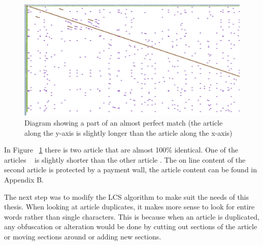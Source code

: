 \begin{figure}
	\centering
	\includegraphics[scale=0.4]{figures/PerfectMatch}
	\caption{Diagram showing a part of an almost perfect match (the article along the y-axis is slightly longer than the article along the x-axis)}
	\label{Match}
\end{figure}

In Figure ~\ref{Match} there is two article that are almost 100\% identical. One of the articles ~\cite{JV1} is slightly shorter than the other article \cite{Lemvig1}. The on line content of the second article is protected by a payment wall, the article content can be found in Appendix B.

The next step was to modify the LCS algorithm to make suit the needs of this thesis. When looking at article duplicates, it makes more sense to look for entire words rather than single characters. This is because when an article is duplicated, any obfuscation or alteration would be done by cutting out sections of the article or moving sections around or adding new sections.



